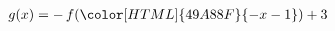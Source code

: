 \documentclass[preview]{standalone}
\begin{document}
\begin{align*}
g(x)= -\,f(\color[HTML]{49A88F}{-x-1}) + 3
\end{align*}
\end{document}

